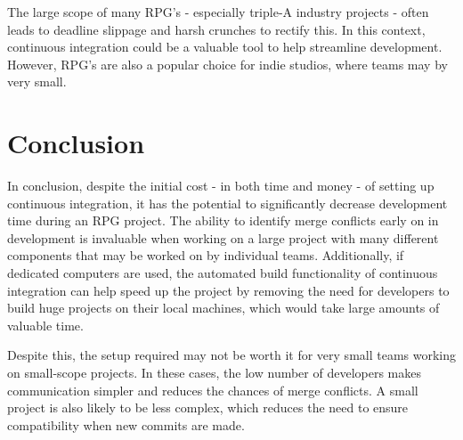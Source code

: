 \documentclass{scrartcl}
\begin{document}
The large scope of many RPG's - especially triple-A industry projects - often leads to deadline slippage and harsh crunches to rectify this. In this context, continuous integration could be a valuable tool to help streamline development. However, RPG's are also a popular choice for indie studios, where teams may by very small.


\section{Conclusion}

In conclusion, despite the initial cost - in both time and money - of setting up continuous integration, it has the potential to significantly decrease development time during an RPG project. The ability to identify merge conflicts early on in development is invaluable when working on a large project with many different components that may be worked on by individual teams. Additionally, if dedicated computers are used, the automated build functionality of continuous integration can help speed up the project by removing the need for developers to build huge projects on their local machines, which would take large amounts of valuable time. \cite{gamasutraCIprocess}

Despite this, the setup required may not be worth it for very small teams working on small-scope projects. In these cases, the low number of developers makes communication simpler and reduces the chances of merge conflicts. A small project is also likely to be less complex, which reduces the need to ensure compatibility when new commits are made. 





\end{document}
